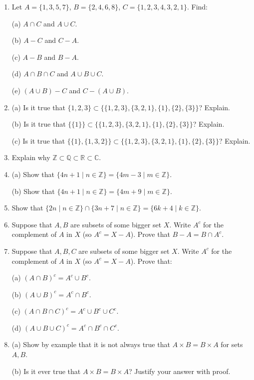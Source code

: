 \documentclass[11pt]{article}
\newenvironment{problems}
{
 \begin{enumerate}[topsep=1pt,itemsep=0pt,parsep=2pt,leftmargin=0.6cm,%
 label={\arabic*.}, ref=\arabic*] \small
}
{
 \end{enumerate}
}
\theoremstyle{definition}
\newcommand{\R}{\mathbb{R}} %
\newcommand{\C}{\mathbb{C}} %
\newcommand{\Z}{\mathbb{Z}} %
\newcommand{\Q}{\mathbb{Q}} %
\begin{document}
\begin{problems}

\item Let $A = \{1,3,5,7\}$, $B = \{2, 4, 6, 8\}$, $C = \{ 1,2,3,4,
  3,2,1\}$. Find:

  (a) $A \cap C$ and $A \cup C$.

  (b) $A - C$ and $C - A$.

  (c) $A - B$ and $B - A$.

  (d) $A \cap B \cap C$ and $A \cup B \cup C$.

  (e) $(A \cup B) - C$ and $C - (A \cup B)$.

\item (a) Is it true that $\{1,2,3\} \subset \{ \{1,2,3\}, \{3,2,1\},
  \{1\}, \{2\}, \{3\} \}$? Explain.

  (b) Is it true that $\{\{1\}\} \subset \{ \{1,2,3\}, \{3,2,1\},
  \{1\}, \{2\}, \{3\} \}$? Explain.

  (c) Is it true that $\{\{1\}, \{1,3,2\}\} \subset \{ \{1,2,3\},
  \{3,2,1\}, \{1\}, \{2\}, \{3\} \}$? Explain.


\item Explain why $\Z \subset \Q \subset \R \subset \C$. 

\item (a) Show that $\{ 4n+1 \mid n \in \Z\} = \{ 4m-3 \mid m \in
  \Z\}$.

  (b)  Show that $\{ 4n+1 \mid n \in \Z\} = \{ 4m+9 \mid m \in
  \Z\}$.

\item Show that $\{ 2n \mid n \in \Z \} \cap \{ 3n+7 \mid n \in \Z \}
  = \{ 6k+4 \mid k \in \Z \}$.

\item Suppose that $A,B$ are subsets of some bigger set $X$. Write
  $A^c$ for the complement of $A$ in $X$ (so $A^c = X-A$). Prove that
  $B-A = B \cap A^c$.

\item Suppose that $A,B,C$ are subsets of some bigger set $X$. Write
  $A^c$ for the complement of $A$ in $X$ (so $A^c = X-A$). Prove that:

  (a) $(A \cap B)^c = A^c \cup B^c$.

  (b) $(A \cup B)^c = A^c \cap B^c$.

  (c) $(A \cap B \cap C)^c = A^c \cup B^c \cup C^c$.

  (d) $(A \cup B \cup C)^c = A^c \cap B^c \cap C^c$.

\item (a) Show by example that it is not always true that $A \times B = B
  \times A$ for sets $A,B$. 

  (b) Is it ever true that $A \times B = B \times A$? Justify your
  answer with proof.

\end{problems}
\end{document}
